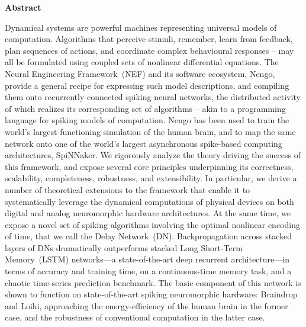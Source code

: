 {}
\begin{center}\textbf{Abstract}\end{center}

Dynamical systems are powerful machines representing universal models of computation.
Algorithms that perceive stimuli, remember, learn from feedback, plan sequences of actions, and coordinate complex behavioural responses -- may all be formulated using coupled sets of nonlinear differential equations.
The Neural Engineering Framework~(NEF) and its software ecosystem, Nengo, provide a general recipe for expressing such model descriptions, and compiling them onto recurrently connected spiking neural networks, the distributed activity of which realizes its corresponding set of algorithms -- akin to a programming language for spiking models of computation.
Nengo has been used to train the world's largest functioning simulation of the human brain, and to map the same network onto one of the world's largest asynchronous spike-based computing architectures, SpiNNaker.
We rigorously analyze the theory driving the success of this framework, and expose several core principles underpinning its correctness, scalability, completeness, robustness, and extensibility.
In particular, we derive a number of theoretical extensions to the framework that enable it to systematically leverage the dynamical computations of physical devices on both digital and analog neuromorphic hardware architectures.
At the same time, we expose a novel set of spiking algorithms involving the optimal nonlinear encoding of time, that we call the Delay Network~(DN).
Backpropagation across stacked layers of DNs dramatically outperforms stacked Long Short-Term Memory~(LSTM) networks---a state-of-the-art deep recurrent architecture---in terms of accuracy and training time, on a continuous-time memory task, and a chaotic time-series prediction benchmark.
The basic component of this network is shown to function on state-of-the-art spiking neuromorphic hardware: Braindrop and Loihi, approaching the energy-efficiency of the human brain in the former case, and the robustness of conventional computation in the latter case.

\cleardoublepage
